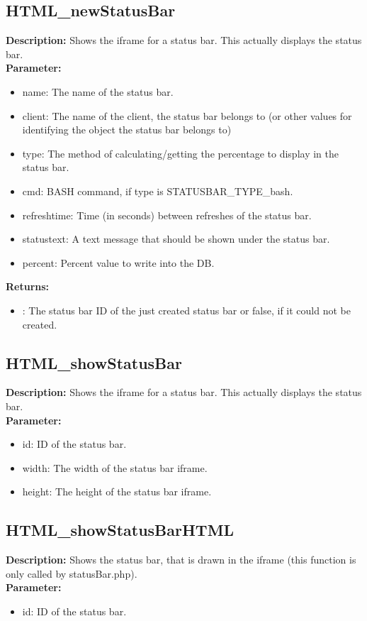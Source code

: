 \subsection{HTML\_newStatusBar}
\textbf{Description:} Shows the iframe for a status bar. This actually displays the status bar.\\
\textbf{Parameter:}
\begin{itemize}
\item name: The name of the status bar.
\item client: The name of the client, the status bar belongs to (or other values for identifying the object the status bar belongs to)
\item type: The method of calculating/getting the percentage to display in the status bar.
\item cmd: BASH command, if type is STATUSBAR\_TYPE\_bash.
\item refreshtime: Time (in seconds) between refreshes of the status bar.
\item statustext: A text message that should be shown under the status bar.
\item percent: Percent value to write into the DB.
\end{itemize}
\textbf{Returns:}
\begin{itemize}
\item : The status bar ID of the just created status bar or false, if it could not be created.
\end{itemize}

\subsection{HTML\_showStatusBar}
\textbf{Description:} Shows the iframe for a status bar. This actually displays the status bar.\\
\textbf{Parameter:}
\begin{itemize}
\item id: ID of the status bar.
\item width: The width of the status bar iframe.
\item height: The height of the status bar iframe.
\end{itemize}

\subsection{HTML\_showStatusBarHTML}
\textbf{Description:} Shows the status bar, that is drawn in the iframe (this function is only called by statusBar.php).\\
\textbf{Parameter:}
\begin{itemize}
\item id: ID of the status bar.
\end{itemize}


